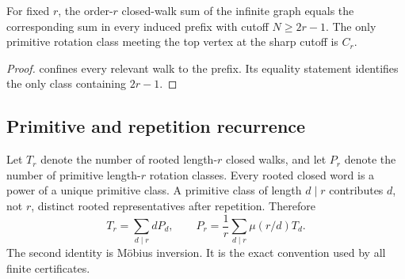 \begin{corollary}
\label{cor:cutoff}
For fixed \(r\), the order-\(r\) closed-walk sum of the infinite graph equals
the corresponding sum in every induced prefix with cutoff \(N\ge2r-1\).
The only primitive rotation class meeting the top vertex at the sharp cutoff
is \(C_r\).
\end{corollary}

\begin{proof}
 confines every relevant walk to the prefix.  Its
equality statement identifies the only class containing \(2r-1\).
\end{proof}

\subsection{Primitive and repetition recurrence}

Let \(T_r\) denote the number of rooted length-\(r\) closed walks, and let
\(P_r\) denote the number of primitive length-\(r\) rotation classes.
Every rooted closed word is a power of a unique primitive class.  A primitive
class of length \(d\mid r\) contributes \(d\), not \(r\), distinct rooted
representatives after repetition.  Therefore
\begin{equation}
\label{eq:necklace}
 T_r=\sum_{d\mid r}dP_d,
 \qquad
 P_r=\frac1r\sum_{d\mid r}\mu(r/d)T_d.
\end{equation}
The second identity is Möbius inversion.  It is the exact convention used by
all finite certificates.

\begin{table}[t]
\centering
\caption{Exact unweighted rooted traces \(T_r\) and primitive rotation counts
\(P_r\).  By \cref{cor:cutoff}, the values are infinite-graph quantities,
not cutoff estimates.}
\label{tab:counts}
\small
\setlength{\tabcolsep}{4.2pt}
\end{table}

